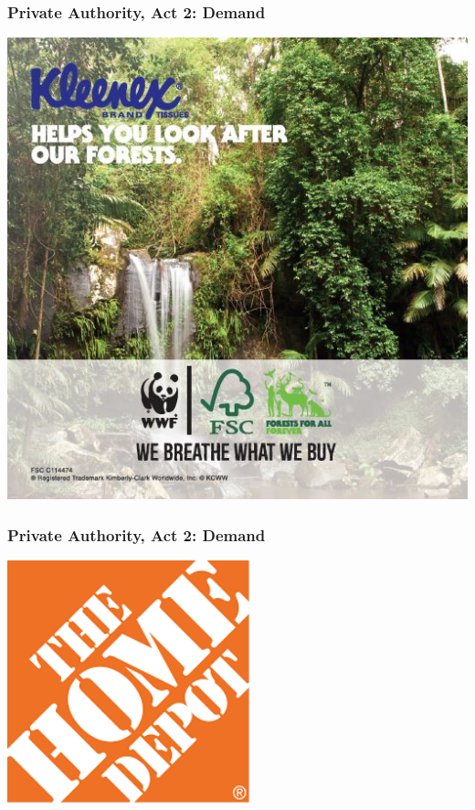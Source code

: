 \documentclass[10pt]{beamer}
\begin{document}
\begin{frame}
\frametitle{Private Authority, Act 2: Demand}
\centering
\includegraphics[height = \textheight]{kleenex3}
\end{frame}

\begin{frame}
\frametitle{Private Authority, Act 2: Demand}
\centering
\includegraphics[height =7cm]{homedopot}
\end{frame}
\end{document}
